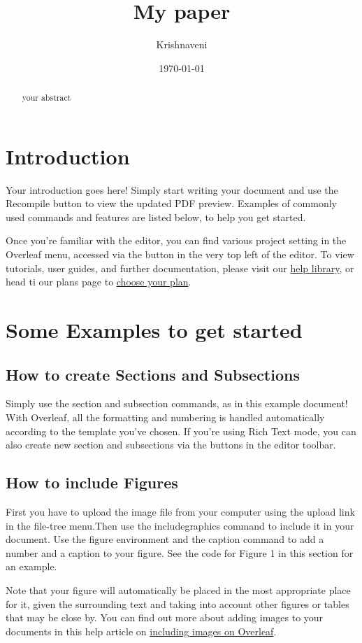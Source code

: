 \documentclass{article}
\title{My paper}
\author{Krishnaveni}
\date{\today}
\begin{document}
\maketitle
\begin{abstract}
      your abstract
\end{abstract}
	\section{Introduction}
Your introduction goes here! Simply start writing your document and use the Recompile button to view the updated PDF preview. Examples of commonly used commands and features are listed below, to help you get started.
	
Once you’re familiar with the editor, you can find various project setting in the Overleaf menu,
accessed via the button in the very top left of the editor.
To view tutorials, user guides, and further documentation, please visit our \href{https://www.overleaf.com/learn}{help library}, or head ti our plans page to \href{https://www.overleaf.com/user/subscription/plans}{choose your plan}.
	
	\section{Some Examples to get started}
		
	\subsection{ How to create Sections and Subsections}
Simply use the section and subsection commands, as in this example document! With Overleaf, all the formatting and numbering is handled automatically according to the template you’ve chosen. If you’re using Rich Text mode, you can also create new section and subsections via the buttons in the editor toolbar.

\subsection{How to include Figures}

First you have to upload the image file from your computer using the upload link in the file-tree menu.Then use the includegraphics command to include it in  your document. Use the figure environment and the caption command to add a number and a caption to your figure. See the code for Figure 1 in this section for an example.
    
Note that your figure will automatically be placed in    the most appropriate place for it, given the surrounding text and taking into account other figures or tables that may be close by. You can find out more about adding images to your documents in this   help article on \href{https://www.overleaf.com/learn/how-to/Including_images_on_Overleaf}{including images on Overleaf}. 
    
\end{document}
